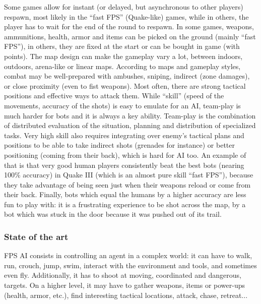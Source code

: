 Some games allow for instant (or delayed, but asynchronous to other players) respawn, most likely in the ``fast FPS'' (Quake-like) games, while in others, the player has to wait for the end of the round to respawn. In some games, weapons, ammunitions, health, armor and items can be picked on the ground (mainly ``fast FPS''), in others, they are fixed at the start or can be bought in game (with points). The map design can make the gameplay vary a lot, between indoors, outdoors, arena-like or linear maps. According to maps and gameplay styles, combat may be well-prepared with ambushes, sniping, indirect (zone damages), or close proximity (even to fist weapons). Most often, there are strong tactical positions and effective ways to attack them. While ``skill'' (speed of the movements, accuracy of the shots) is easy to emulate for an AI, team-play is much harder for bots and it is always a key ability. Team-play is the combination of distributed evaluation of the situation, planning and distribution of specialized tasks. Very high skill also requires integrating over enemy's tactical plans and positions to be able to take indirect shots (grenades for instance) or better positioning (coming from their back), which is hard for AI too. An example of that is that very good human players consistently beat the best bots (nearing 100\% accuracy) in Quake III (which is an almost pure skill ``fast FPS''), because they take advantage of being seen just when their weapons reload or come from their back. Finally, bots which equal the humans by a higher accuracy are less fun to play with: it is a frustrating experience to be shot across the map, by a bot which was stuck in the door because it was pushed out of its trail.

\subsubsection{State of the art}

FPS AI consists in controlling an agent in a complex world: it can have to walk, run, crouch, jump, swim, interact with the environment and tools, and sometimes even fly. Additionally, it has to shoot at moving, coordinated and dangerous, targets. %
On a higher level, it may have to gather weapons, items or power-ups (health, armor, etc.), find interesting tactical locations, attack, chase, retreat...

